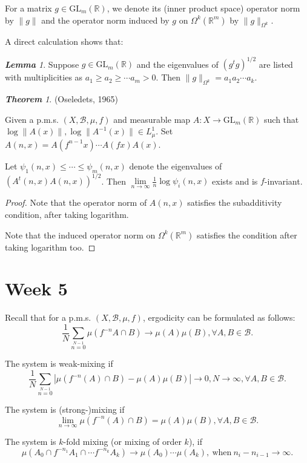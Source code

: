 \documentclass[10pt, a4paper, oneside]{report}
\numberwithin{equation}{chapter}
\theoremstyle{remark}
\newtheorem{theorem}[definition]{\bf{Theorem}}
\newtheorem{lemma}[definition]{\bf{Lemma}}
\theoremstyle{remark}
\begin{document}
    For a matrix $g\in\mathrm{GL}_m(\mathbb{R})$, we denote its (inner product space) operator norm by $\|g\|$ and the operator norm induced by $g$ on $\Omega^k(\mathbb{R}^m)$ by $\|g\|_{\Omega^k}.$   

    A direct calculation shows that:
    
\begin{lemma}
    Suppose $g\in\mathrm{GL}_m(\mathbb{R})$ and the eigenvalues of $(g^tg)^{1/2}$ are listed with multiplicities as $a_1\geqslant a_2\geqslant\cdots a_m>0$. Then $\|g\|_{\Omega^k}=a_1a_2\cdots a_k.$
\end{lemma}

\begin{theorem}
(Oseledets, 1965)

    Given a p.m.s. $(X,\mathcal{B},\mu,f)$ and measurable map $A:X\rightarrow \mathrm{GL}_m(\mathbb{R})$ such that $\log\|A(x)\|,\log\|A^{-1}(x)\|\in L_\mu^1$. Set $A(n,x)=A(f^{n-1}x)\cdots A(fx)A(x)$.

    Let $\psi_1(n,x)\leqslant\cdots\leqslant\psi_m(n,x)$ denote the eigenvalues of $(A^t(n,x)A(n,x))^{1/2}$. Then $\lim\limits_{n\to\infty}\frac{1}{n}\log\psi_i(n,x)$ exists and is $f$-invariant.
\end{theorem}

\begin{proof}
    Note that the operator norm of $A(n,x)$ satisfies the subadditivity condition, after taking logarithm.

    Note that the induced operator norm on $\Omega^k(\mathbb{R}^m)$ satisfies the condition after taking logarithm too.
\end{proof}

\chapter{Week 5}
    Recall that for a p.m.s. $(X,\mathcal{B},\mu,f)$, ergodicity can be formulated as follows:
    $$\frac{1}{N}\sum\limits_{n=0}\limits^{N-1}\mu(f^{-n}A\cap B)\to\mu(A)\mu(B),\forall A,B\in\mathcal{B}.$$

    The system is weak-mixing if $$\frac{1}{N}\sum\limits_{n=0}\limits^{N-1}|\mu(f^{-n}(A)\cap B)-\mu(A)\mu(B)|\to 0,N\to\infty,\forall A,B\in\mathcal{B}.$$

    The system is (strong-)mixing if $$\lim\limits_{n\to\infty}\mu(f^{-n}(A)\cap B)=\mu(A)\mu(B),\forall A,B\in\mathcal{B}.$$

    The system is $k$-fold mixing (or mixing of order $k$), if $$\mu(A_0\cap f^{-n_1}A_1\cap\cdots f^{-n_k}A_k)\to\mu(A_0)\cdots\mu(A_k),~\text{when}~n_i-n_{i-1}\to\infty.$$
\end{document}
